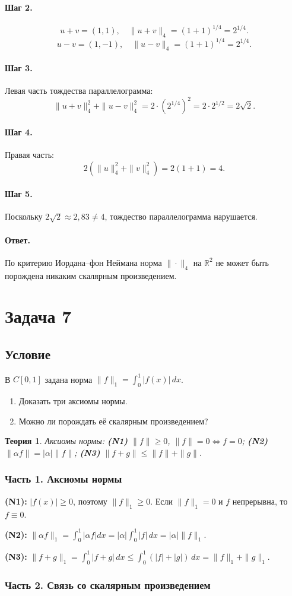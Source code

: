 \documentclass[12pt,a4paper]{article}
\theoremstyle{solution}
\newtheorem*{theory}{Теория}
\newcommand{\task}[1]{\newpage\section*{Задача #1}}
\newcommand{\answer}{\paragraph{Ответ.}}
\newcommand{\step}[1]{\paragraph{Шаг #1.}}
\newcommand{\R}{\mathbb{R}}
\begin{document}
\step{2}
\[
u+v=(1,1),\quad\|u+v\|_4=(1+1)^{1/4}=2^{1/4}.
\]
\[
u-v=(1,-1),\quad\|u-v\|_4=(1+1)^{1/4}=2^{1/4}.
\]

\step{3} Левая часть тождества параллелограмма:
\[
\|u+v\|_4^2+\|u-v\|_4^2=2\cdot(2^{1/4})^2=2\cdot 2^{1/2}=2\sqrt{2}.
\]

\step{4} Правая часть:
\[
2(\|u\|_4^2+\|v\|_4^2)=2(1+1)=4.
\]

\step{5} Поскольку $2\sqrt{2}\approx 2{,}83\neq 4$, тождество параллелограмма нарушается.

\answer По критерию Иордана--фон Неймана норма $\|\cdot\|_4$ на $\R^2$ не может быть порождена никаким скалярным произведением.

\task{7}
\subsection*{Условие}
В $C[0,1]$ задана норма $\|f\|_1=\int_0^1|f(x)|\,dx$.
\begin{enumerate}
\item Доказать три аксиомы нормы.
\item Можно ли порождать её скалярным произведением?
\end{enumerate}

\begin{theory}
Аксиомы нормы: \textbf{(N1)} $\|f\|\geq0$, $\|f\|=0\Leftrightarrow f=0$; \textbf{(N2)} $\|\alpha f\|=|\alpha|\|f\|$; \textbf{(N3)} $\|f+g\|\leq\|f\|+\|g\|$.
\end{theory}

\subsubsection*{Часть 1. Аксиомы нормы}

\textbf{(N1):} $|f(x)|\geq0$, поэтому $\|f\|_1\geq0$. Если $\|f\|_1=0$ и $f$ непрерывна, то $f\equiv0$.

\textbf{(N2):} $\|\alpha f\|_1=\int_0^1|\alpha f|dx=|\alpha|\int_0^1|f|\,dx=|\alpha|\|f\|_1$.

\textbf{(N3):} $\|f+g\|_1=\int_0^1|f+g|\,dx\leq\int_0^1(|f|+|g|)\,dx=\|f\|_1+\|g\|_1$.

\subsubsection*{Часть 2. Связь со скалярным произведением}
\end{document}
